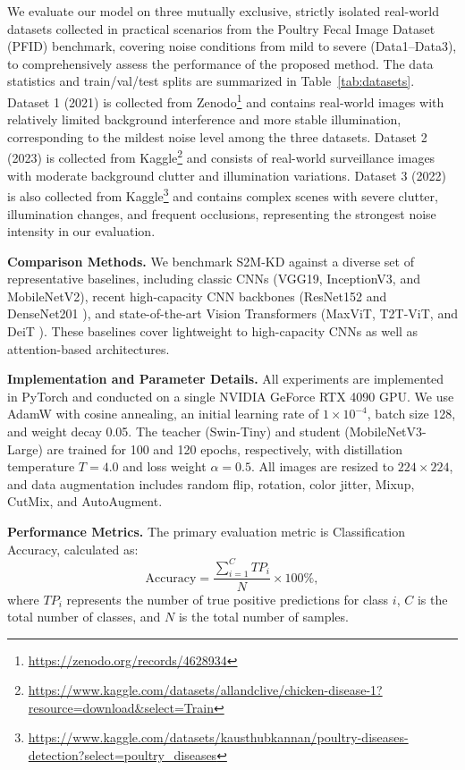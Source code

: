 \documentclass[review]{elsarticle}
\begin{document}
We evaluate our model on three mutually exclusive, strictly isolated real-world datasets collected in practical scenarios from the Poultry Fecal Image Dataset (PFID) benchmark, covering noise conditions from mild to severe (Data1--Data3), to comprehensively assess the performance of the proposed method. The data statistics and train/val/test splits are summarized in Table~\ref{tab:datasets}. Dataset 1 (2021) is collected from Zenodo\footnote{\url{https://zenodo.org/records/4628934}}
 and contains real-world images with relatively limited background interference and more stable illumination, corresponding to the mildest noise level among the three datasets. Dataset 2 (2023) is collected from Kaggle\footnote{\url{https://www.kaggle.com/datasets/allandclive/chicken-disease-1?resource=download&select=Train}}
 and consists of real-world surveillance images with moderate background clutter and illumination variations. Dataset 3 (2022) is also collected from Kaggle\footnote{\url{https://www.kaggle.com/datasets/kausthubkannan/poultry-diseases-detection?select=poultry_diseases}}
 and contains complex scenes with severe clutter, illumination changes, and frequent occlusions, representing the strongest noise intensity in our evaluation.

\noindent\textbf{Comparison Methods.} We benchmark S2M-KD against a diverse set of representative baselines, including classic CNNs (VGG19, InceptionV3, and MobileNetV2), recent high-capacity CNN backbones (ResNet152 and DenseNet201 \cite{luo2025optimizing}), and state-of-the-art Vision Transformers (MaxViT, T2T-ViT, and DeiT \cite{fardin2025robust}). These baselines cover lightweight to high-capacity CNNs as well as attention-based architectures.

\noindent\textbf{Implementation and Parameter Details.} All experiments are implemented in PyTorch and conducted on a single NVIDIA GeForce RTX 4090 GPU. We use AdamW with cosine annealing, an initial learning rate of $1\times10^{-4}$, batch size 128, and weight decay 0.05. The teacher (Swin-Tiny) and student (MobileNetV3-Large) are trained for 100 and 120 epochs, respectively, with distillation temperature $T=4.0$ and loss weight $\alpha=0.5$. All images are resized to $224\times224$, and data augmentation includes random flip, rotation, color jitter, Mixup, CutMix, and AutoAugment.

\noindent\textbf{Performance Metrics.} The primary evaluation metric is Classification Accuracy, calculated as:
\begin{equation}
\text{Accuracy} = \frac{\sum_{i=1}^{C} TP_i}{N} \times 100\% ,
\end{equation}
where $TP_i$ represents the number of true positive predictions for class $i$, $C$ is the total number of classes, and $N$ is the total number of samples. 
\end{document}
